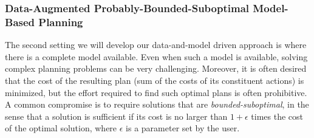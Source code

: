 \documentclass[12pt]{article}
\begin{document}
\subsubsection{Data-Augmented Probably-Bounded-Suboptimal Model-Based Planning}%



 


The second setting we will develop our data-and-model driven approach 
is where there is a complete model available. Even when such a model is available, solving complex planning problems can be very challenging. Moreover, 
it is often desired that the cost of the resulting plan (sum of the costs of its constituent actions) is minimized, but the effort required to find such optimal plans is often prohibitive. A common compromise is to require solutions that are {\em bounded-suboptimal}, in the sense that a solution is sufficient if its cost is no larger than $1+\epsilon$ times the cost of the optimal solution, where $\epsilon$ is a parameter set by the user. 



\end{document}
